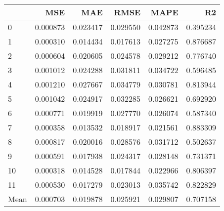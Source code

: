 \begin{tabular}{lrrrrr}
\toprule
 & MSE & MAE & RMSE & MAPE & R2 \\
\midrule
0 & 0.000873 & 0.023417 & 0.029550 & 0.042873 & 0.395234 \\
1 & 0.000310 & 0.014434 & 0.017613 & 0.027275 & 0.876687 \\
2 & 0.000604 & 0.020605 & 0.024578 & 0.029212 & 0.776740 \\
3 & 0.001012 & 0.024288 & 0.031811 & 0.034722 & 0.596485 \\
4 & 0.001210 & 0.027667 & 0.034779 & 0.030781 & 0.813944 \\
5 & 0.001042 & 0.024917 & 0.032285 & 0.026621 & 0.692920 \\
6 & 0.000771 & 0.019919 & 0.027770 & 0.026074 & 0.587340 \\
7 & 0.000358 & 0.013532 & 0.018917 & 0.021561 & 0.883309 \\
8 & 0.000817 & 0.020016 & 0.028576 & 0.031712 & 0.502637 \\
9 & 0.000591 & 0.017938 & 0.024317 & 0.028148 & 0.731371 \\
10 & 0.000318 & 0.014528 & 0.017844 & 0.022966 & 0.806397 \\
11 & 0.000530 & 0.017279 & 0.023013 & 0.035742 & 0.822829 \\
Mean & 0.000703 & 0.019878 & 0.025921 & 0.029807 & 0.707158 \\
\bottomrule
\end{tabular}
